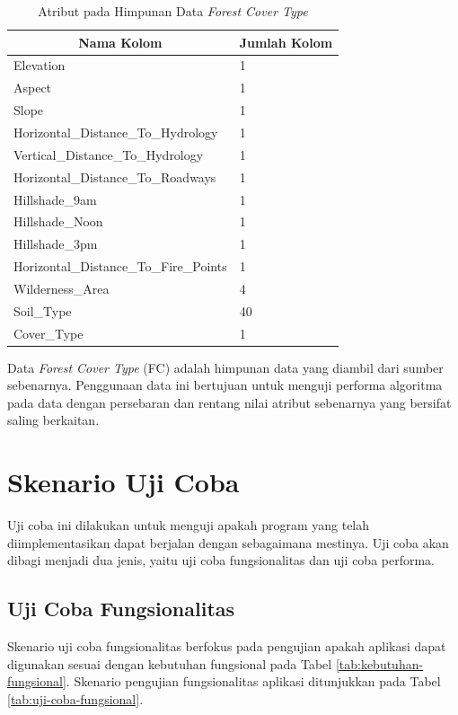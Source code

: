 \begin{table}[H]
	\centering
	\begin{tabular}{ | p{6cm} | p{1cm} | }
		\hline
		\multicolumn{1}{|c}{\textbf{Nama Kolom}} & \multicolumn{1}{|c|}{\textbf{Jumlah Kolom}} \\ \hline \hline
		Elevation & 1 \\ \hline
		Aspect & 1 \\ \hline
		Slope & 1  \\ \hline
		Horizontal\_Distance\_To\_Hydrology & 1 \\ \hline 
		Vertical\_Distance\_To\_Hydrology & 1 \\ \hline 
		Horizontal\_Distance\_To\_Roadways & 1 \\ \hline
		Hillshade\_9am & 1 \\ \hline
		Hillshade\_Noon & 1 \\ \hline
		Hillshade\_3pm & 1 \\ \hline
		Horizontal\_Distance\_To\_Fire\_Points & 1 \\ \hline
		Wilderness\_Area & 4 \\ \hline
		Soil\_Type & 40 \\ \hline
		Cover\_Type & 1 \\ \hline
	\end{tabular} \caption{Atribut pada Himpunan Data \textit{Forest Cover Type}}
	\label{tab:atribut-fc}
\end{table}

Data \textit{Forest Cover Type} (FC) adalah himpunan data yang
diambil dari sumber sebenarnya. Penggunaan data ini bertujuan
untuk menguji performa algoritma pada data dengan persebaran
dan rentang nilai atribut sebenarnya yang bersifat saling berkaitan.

\section{Skenario Uji Coba} \label{skenarioujicoba}
\tab Uji coba ini dilakukan untuk menguji apakah program yang telah diimplementasikan dapat berjalan dengan sebagaimana mestinya. Uji coba akan dibagi menjadi dua jenis, yaitu uji coba fungsionalitas dan uji coba performa.

\subsection{Uji Coba Fungsionalitas}
\tab Skenario uji coba fungsionalitas berfokus pada pengujian apakah aplikasi dapat digunakan sesuai dengan kebutuhan fungsional pada Tabel \ref{tab:kebutuhan-fungsional}. Skenario pengujian fungsionalitas aplikasi ditunjukkan pada Tabel \ref{tab:uji-coba-fungsional}.

